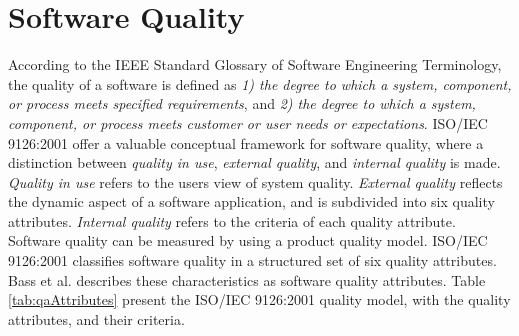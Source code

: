 
\section{Software Quality}
\label{sec:softwarequality}
According to the IEEE Standard Glossary of Software Engineering Terminology\cite{radatz1990ieee}, the quality of a software is defined as \textit{1) the degree to which a system, component, or process meets specified requirements}, and \textit{2) the degree to which a system, component, or process meets customer or user needs or expectations}. ISO/IEC 9126:2001 offer a valuable conceptual framework for software quality, where a distinction between \textit{quality in use}, \textit{external quality}, and \textit{internal quality} is made\cite{ISOIEC9126}. \textit{Quality in use} refers to the users view of system quality. \textit{External quality} reflects the dynamic aspect of a software application, and is subdivided into six quality attributes. \textit{Internal quality} refers to the criteria of each quality attribute. Software quality can be measured by using a product quality model. ISO/IEC 9126:2001 classifies software quality in a structured set of six quality attributes\cite{ISOIEC9126}. Bass et al.\cite{Bass:2012:SAP:2392670} describes these characteristics as software quality attributes. Table \ref{tab:qaAttributes} present the ISO/IEC 9126:2001 quality model, with the quality attributes, and their criteria.  

